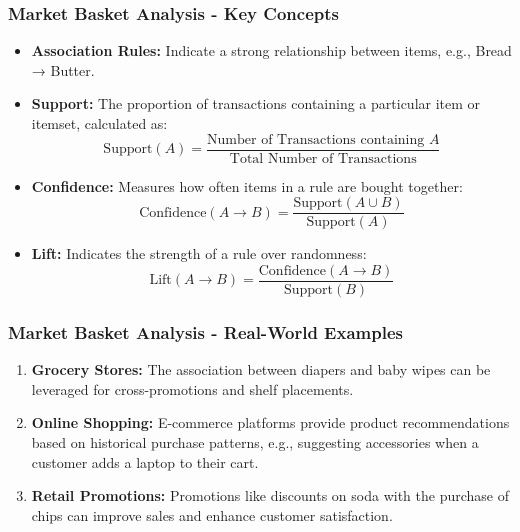 \documentclass{beamer}
\begin{document}
\begin{frame}[fragile]
    \frametitle{Market Basket Analysis - Key Concepts}
    \begin{itemize}
        \item \textbf{Association Rules:} Indicate a strong relationship between items, e.g., {Bread} → {Butter}.
        
        \item \textbf{Support:} The proportion of transactions containing a particular item or itemset, calculated as:
        \begin{equation}
            \text{Support}(A) = \frac{\text{Number of Transactions containing } A}{\text{Total Number of Transactions}}
        \end{equation}
        
        \item \textbf{Confidence:} Measures how often items in a rule are bought together:
        \begin{equation}
            \text{Confidence}(A \rightarrow B) = \frac{\text{Support}(A \cup B)}{\text{Support}(A)}
        \end{equation}
        
        \item \textbf{Lift:} Indicates the strength of a rule over randomness:
        \begin{equation}
            \text{Lift}(A \rightarrow B) = \frac{\text{Confidence}(A \rightarrow B)}{\text{Support}(B)}
        \end{equation}
    \end{itemize}
\end{frame}

\begin{frame}[fragile]
    \frametitle{Market Basket Analysis - Real-World Examples}
    \begin{enumerate}
        \item \textbf{Grocery Stores:} The association between diapers and baby wipes can be leveraged for cross-promotions and shelf placements.
        
        \item \textbf{Online Shopping:} E-commerce platforms provide product recommendations based on historical purchase patterns, e.g., suggesting accessories when a customer adds a laptop to their cart.
        
        \item \textbf{Retail Promotions:} Promotions like discounts on soda with the purchase of chips can improve sales and enhance customer satisfaction.
    \end{enumerate}
\end{frame}
\end{document}

